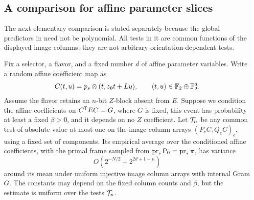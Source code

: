 \subsection{A comparison for affine parameter slices}

The next elementary comparison is stated separately because the
global predictors in  need not be polynomial.
All tests in it are common functions of the displayed image
columns; they are not arbitrary orientation-dependent tests.

\begin{lemma}
\label{lem:synthetic-slice}
Fix a selector, a flavor, and a fixed number \(d\) of affine
parameter variables.  Write a random affine coefficient map as
\[
 C(t,u)=p_s\otimes(t,z_0t+Lu),
 \qquad (t,u)\in\mathbb F_2\oplus\mathbb F_2^d.
 \]
Assume the flavor retains an \(n\)-bit \(Z\)-block absent from
\(E\).  Suppose we condition the affine coefficients on
\(C^{\mathsf T} EC=G\), where \(G\) is fixed, this event has probability
at least a fixed \(\beta>0\), and it depends on no \(Z\)
coefficient.
Let \({\cal T}_n\) be any common test of absolute value at most
one on the image column arrays \((P_eC,Q_eC)_e\), using a fixed
set of components.  Its empirical average over the conditioned
affine coefficients, with the primal frame sampled from
\(\operatorname{pr}_*{\mathsf P_0}=\operatorname{pr}_*\pi\), has variance
\[
 O(2^{-N/2}+2^{2d+1-n})
 \]
around its mean under uniform injective image column arrays
with internal Gram \(G\).
The constants may depend on the fixed column counts and
\(\beta\), but the estimate is uniform over the tests
\({\cal T}_n\).
\end{lemma}

